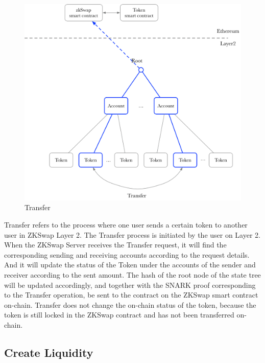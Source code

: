 \documentclass[]{template/llncs}
\begin{document}
\begin{figure}[htbp]
\centering
\includegraphics[width=0.9\columnwidth]{figure/transfer}
\caption{Transfer}
\label{fig:transfer}
\end{figure}

Transfer refers to the process where one user sends a certain token to another user in ZKSwap Layer 2. The Transfer process is initiated by the user on Layer 2. When the ZKSwap Server receives the Transfer request, it will find the corresponding sending and receiving accounts according to the request details.
And it will update the status of the Token under the accounts of the sender and receiver according to the sent amount. The hash of the root node of the state tree will be updated accordingly, and together with the SNARK proof corresponding to the Transfer operation, be sent to the contract on the ZKSwap smart contract on-chain. Transfer does not change the on-chain status of the token, because the token is still locked in the ZKSwap contract and has not been transferred on-chain.


\subsection{Create Liquidity}
\end{document}
